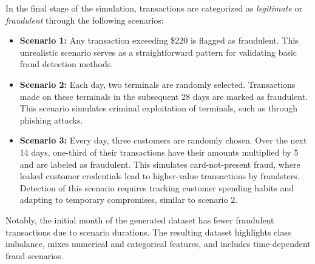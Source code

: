     In the final stage of the simulation, transactions are categorized as
\emph{legitimate} or \emph{fraudulent} through the following scenarios:

\begin{itemize}
\tightlist
\item
  \textbf{Scenario 1:} Any transaction exceeding \$220 is flagged as
  fraudulent. This unrealistic scenario serves as a straightforward
  pattern for validating basic fraud detection methods.
\item
  \textbf{Scenario 2:} Each day, two terminals are randomly selected.
  Transactions made on these terminals in the subsequent 28 days are
  marked as fraudulent. This scenario simulates criminal exploitation of
  terminals, such as through phishing attacks.
\item
  \textbf{Scenario 3:} Every day, three customers are randomly chosen.
  Over the next 14 days, one-third of their transactions have their
  amounts multiplied by 5 and are labeled as fraudulent. This simulates
  card-not-present fraud, where leaked customer credentials lead to
  higher-value transactions by fraudsters. Detection of this scenario
  requires tracking customer spending habits and adapting to temporary
  compromises, similar to scenario 2.
\end{itemize}

Notably, the initial month of the generated dataset has fewer fraudulent
transactions due to scenario durations. The resulting dataset highlights
class imbalance, mixes numerical and categorical features, and includes
time-dependent fraud scenarios.

